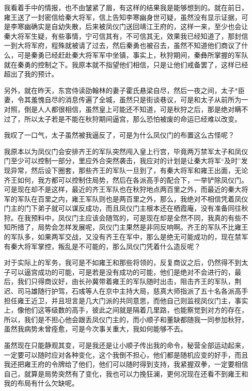 我看着手中的情报，也不由皱紧了眉，有这样的结果我是能够想到的。就在前日，雍王送了一封密信给秦大将军，信上告知李寒幽身世可疑，虽然没有显示证据，可是李寒幽确实是自幼失散，后来被凤仪门送回靖江王府的，这样一来，至少也会让秦大将军生疑，有些事情，宁可信其有，不可信其无，效果我已经知道了，那封信一到大将军府，程殊就被请了过去，然后秦勇也被召去，虽然不知道他们商议了什么，可是秦勇已经赶赴秦大将军军中坐镇，事实上，秋狩期间，秦彝所掌握的军队就在秦勇的控制之下。我原本就不指望他们相信，只是让他们戒备罢了，这样已经超出了我的预计。

另外，就在昨天，东宫侍读劭翰林的妻子霍氏悬梁自尽，然后一夜之间，太子*臣妻，令其羞愧自尽的消息传遍了全城，虽然只是街谈巷议，可是和太子从前所为一对照，倒是人人都很相信，虽然皇上可能还不知道，可是秋狩之后，那是绝对瞒不过了，所以太子若是不能在秋狩期间逼宫，那么恐怕被废的命运已经难以改变。

我叹了一口气，太子虽然被我逼反了，可是为什么凤仪门的布置这么古怪呢？

我原本以为凤仪门会安排齐王的军队突然闯入皇上行宫，毕竟两万禁军太子和凤仪门至少可以控制一部分，里应外合突然袭击，我应对的计划是让秦大将军“及时”发现异常，然后设下圈套，那些齐王的军队一旦到了，有秦大将军和雍王出面，无论齐王如何，我方都可以控制住局势，然后在各派高手的配合下，一举铲除凤仪门。可是现在却不是这样，最近的齐王军队也在秋狩地点两百里之外，而最近的秦大将军的军队在百里之内，雍王军队则也是两百里之外，那么，我绝对不相信凭着凤仪门主的门下弟子就可以谋反成功，而且凤仪门主根本还在栖霞庵，没有准备同往秋狩。在我预料中，凤仪门主应该会随驾的，可是现在却是全然不同，我真的有些不知所措了，局势会怎样发展呢，凤仪门主果然是非同反响啊。齐王的军队不比雍王的军队多，如果两军交战，又没有齐王在军中，那么是绝无可能成功的，现在禁军有秦大将军掌控，叛乱是不可能的，那么凤仪门凭着什么造反呢？

对于实际上的军务，我可是不如雍王和那些将领的，反复商议之后，仍然得不到太子可以逼宫成功的可能，可是若是没有成功的可能，他们是绝对不会进行的，最后，我们只得商议好，由长孙冀带着雍王的军队随时出击，阻击齐王的军队，荆迟、司马雄随行护驾，石彧等人在京中主持大局，慈真大师指派了五十名各派高手担任雍王近卫，并且坦言是几大门派的共同意思，而他自己则监视凤仪门主，事实上，像他们这等级数的高手，彼此之间就是隔着几里路，也能察觉到对方的存在，所以，我们是不担心他会跟丢凤仪门主的，而小顺子和董缺都随我一同参加秋狩，虽然我病势未曾痊愈，可是今次事关重大，我如何能够不去。

虽然现在只能静观其变，可是我还是让小顺子传出我的命令，秘营全部运动起来，一定要可以随时应对各种变化，这个我倒不担心，他们都是随机应变的好手，而且我还把雍王府的令牌给了他们，他们可以随时得到支持，我紧握双拳，一定要相信自己，就算是局势突然有了变化，我也可以力挽狂澜，更何况现在还看不到雍王和我的布局有什么欠缺呢。

